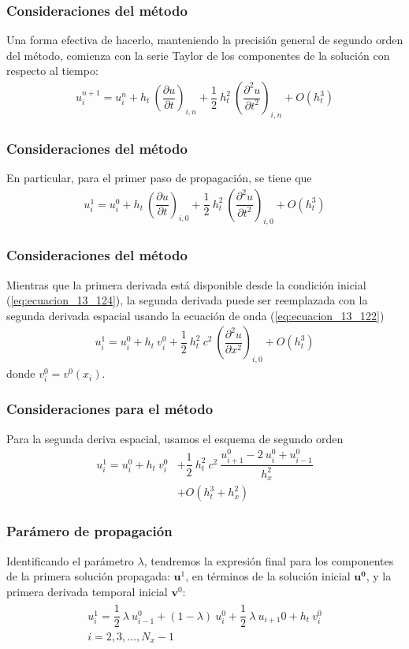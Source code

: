 \begin{frame}
\frametitle{Consideraciones del método}
Una forma efectiva de hacerlo, manteniendo la precisión general de segundo orden del método, comienza con la serie Taylor de los componentes de la solución con respecto al tiempo:
\begin{align*}
u_{i}^{n+1} = u_{i}^{n} + h_{t} \: \left( \dfrac{\partial u}{\partial t} \right)_{i,n} + \dfrac{1}{2} \: h_{t}^{2} \: \left( \dfrac{\partial^{2} u}{\partial t^{2}} \right)_{i,n} + O(h_{t}^{3})
\end{align*}
\end{frame}
\begin{frame}
\frametitle{Consideraciones del método}
En particular, para el primer paso de propagación, se tiene que
\begin{align*}
u_{i}^{1} = u_{i}^{0} + h_{t} \: \left( \dfrac{\partial u}{\partial t} \right)_{i,0} + \dfrac{1}{2} \: h_{t}^{2} \: \left( \dfrac{\partial^{2} u}{\partial t^{2}} \right)_{i,0} + O(h_{t}^{3})
\end{align*}
\end{frame}
\begin{frame}
\frametitle{Consideraciones del método}
Mientras que la primera derivada está disponible desde la condición inicial (\ref{eq:ecuacion_13_124}), la segunda derivada puede ser reemplazada con la segunda derivada espacial usando la ecuación de onda (\ref{eq:ecuacion_13_122})
\begin{align*}
u_{i}^{1} = u_{i}^{0} + h_{t} \: v_{i}^{0} + \dfrac{1}{2} \: h_{t}^{2} \: c^{2} \: \left( \dfrac{\partial^{2} u}{\partial x^{2}} \right)_{i, 0} + O(h_{t}^{3})
\end{align*}
donde $v_{i}^{0} = v^{0}(x_{i})$.
\end{frame}
\begin{frame}
\frametitle{Consideraciones para el método}
Para la segunda deriva espacial, usamos el esquema de segundo orden
\begin{align*}
u_{i}^{1} = u_{i}^{0} + h_{t} \: v_{i}^{0} &+ \dfrac{1}{2} \: h_{t}^{2} \: c^{2} \: \dfrac{u_{i+1}^{0} - 2 \: u_{i}^{0} + u_{i-1}^{0}}{h_{x}^{2}} \\
&+ O(h_{t}^{3} + h_{x}^{2})
\end{align*}
\end{frame}
\begin{frame}
\frametitle{Parámero de propagación}
Identificando el parámetro $\lambda$, tendremos la expresión final para los componentes de la primera solución propagada: $\mathbf{u}^{1}$, en términos de la solución inicial $\mathbf{u^{0}}$, y la primera derivada temporal inicial $\mathbf{v}^{0}$:
\begin{align}
\begin{aligned}
u_{i}^{1} = \dfrac{1}{2} \: \lambda \: u_{i-1}^{0} + (1 - \lambda) \: u_{i}^{0} + \dfrac{1}{2} \: \lambda \: u_{i+1}{0} + h_{t} \: v_{i}^{0} \\
i = 2, 3, \ldots, N_{x} - 1
\end{aligned}
\label{eq:ecuacion_13_136}
\end{align}
\end{frame}
